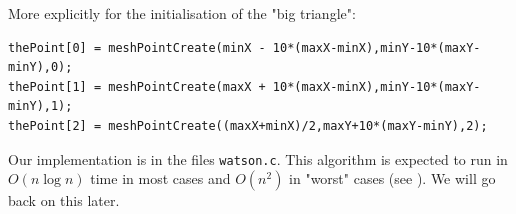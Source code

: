 More explicitly for the initialisation of the "big triangle": 
\begin{verbatim}
thePoint[0] = meshPointCreate(minX - 10*(maxX-minX),minY-10*(maxY-minY),0);
thePoint[1] = meshPointCreate(maxX + 10*(maxX-minX),minY-10*(maxY-minY),1);
thePoint[2] = meshPointCreate((maxX+minX)/2,maxY+10*(maxY-minY),2);
\end{verbatim}

Our implementation is in the files \texttt{watson.c}.
This algorithm is expected to run in $O(n \log n)$ time in most cases and $O(n^2)$ in "worst" cases (see \cite{de2000computational}). We will go back on this later.

\newpage